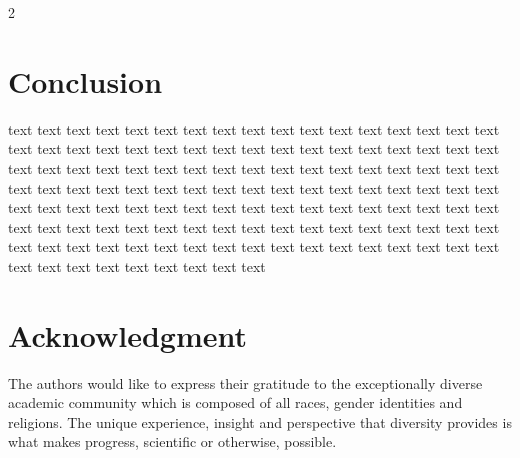 \documentclass[letterpaper,10pt]{article}
\begin{document}
\begin{multicols}{2}
\section{Conclusion}

text text text text text text text text text text text text text text text text text text text text text text text text text text text text text text text text text text text text text text text text text text text text text text text text text text text text text text text text text text text text text text text text text text text text text text text text text text text text text text text text text text text text text text text text text text text text text text text text text text text text text text text text text text text text text text text text text text text text text text text text text text text text text text text text

\section*{Acknowledgment}
The authors would like to express their gratitude to the exceptionally diverse academic community which is composed of all races, gender identities and religions. The unique experience, insight and perspective that diversity provides is what makes progress, scientific or otherwise, possible. 



\end{multicols}
\end{document}
